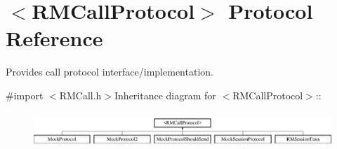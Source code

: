 \hypertarget{protocol_r_m_call_protocol-p}{
\section{$<$RMCallProtocol$>$ Protocol Reference}
\label{protocol_r_m_call_protocol-p}
}


Provides call protocol interface/implementation.  


{\ttfamily \#import $<$RMCall.h$>$}Inheritance diagram for $<$RMCallProtocol$>$::\begin{figure}[H]
\begin{center}
\leavevmode
\includegraphics[height=1.3494cm]{protocol_r_m_call_protocol-p}
\end{center}
\end{figure}
